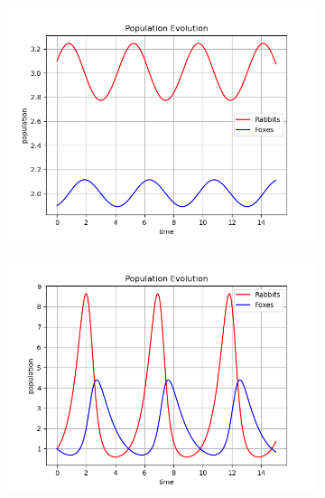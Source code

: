 \begin{figure}[H]
    \begin{subfigure}{0.5\textwidth}
        \centering
        \includegraphics[scale=0.5]{images/2024-06-05-pred_prey_30.png}
    \end{subfigure}
    \begin{subfigure}{0.5\textwidth}
        \centering
        \includegraphics[scale=0.5]{images/2024-06-05-pred_prey_31.png}
    \end{subfigure}
\end{figure}


